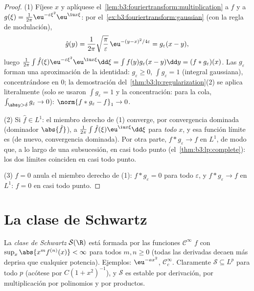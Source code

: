 \begin{proof}
(1) Fíjese $x$ y aplíquese
el~\cref{lem:b3:fouriertransform:multiplication} a $f$ y a
$g(\xi) = \frac1{2\pi}\eu^{-\varepsilon\xi^2}\eu^{\iu x\xi}$:
por el~\cref{ex:b3:fouriertransform:gaussian} (con la regla de
modulación),
\[
\hat g(y) = \frac1{2\pi}\sqrt{\frac\pi\varepsilon}\,
\eu^{-(y - x)^2/4\varepsilon} = g_\varepsilon(x - y),
\]
luego $\frac1{2\pi}\int\hat f(\xi)\eu^{-\varepsilon\xi^2}
\eu^{\iu x\xi}\dd\xi = \int f(y)g_\varepsilon(x - y)\dd y =
(f*g_\varepsilon)(x)$. Las $g_\varepsilon$ forman una aproximación de la
identidad: $g_\varepsilon \geq 0$, $\int g_\varepsilon = 1$ (integral
gaussiana), concentrándose en $0$; la demostración
del~\cref{thm:b3:lp:regularization}(2) se aplica literalmente (solo se
usaron $\int g_\varepsilon = 1$ y la concentración: para la cola,
$\int_{\abs y > \delta}g_\varepsilon \to
0$): $\norm{f * g_\varepsilon - f}_1 \to 0$.

(2) Si $\hat f \in L^1$: el miembro derecho de (1) converge, por
convergencia dominada (dominador $\abs{\hat f}$), a
$\frac1{2\pi}\int\hat
f(\xi)\eu^{\iu x\xi}\dd\xi$ para \emph{todo} $x$, y esa función límite
es  (de nuevo, convergencia
dominada). Por otra parte, $f
* g_\varepsilon \to f$ en $L^1$, de modo que, a lo largo de una
subsucesión, en casi todo punto (el~\cref{thm:b3:lp:complete}): los dos
límites coinciden en casi todo punto.

(3) $\hat f = 0$ anula el miembro derecho de (1): $f *
g_\varepsilon = 0$ para todo $\varepsilon$, y $f *
g_\varepsilon \to f$ en $L^1$: $f = 0$ en casi todo punto.
\end{proof}

\section{La clase de Schwartz}

\begin{definition}\label{def:b3:fouriertransform:schwartz}
La \emph{clase de Schwartz} $\mathcal
S(\R)$ está formada por las funciones $\mathcal C^\infty$ $f$ con
$\sup_x\abs{x^m f^{(n)}(x)} < \infty$ para todos $m, n \geq 0$ (todas
las derivadas decaen más deprisa que cualquier potencia). Ejemplos:
$\eu^{-ax^2}$, $\mathcal C_c^\infty$. Claramente $\mathcal S
\subseteq L^p$ para todo $p$ (acótese por $C(1 + x^2)^{-1}$), y
$\mathcal S$ es estable por derivación, por multiplicación por
polinomios y por productos.
\end{definition}

